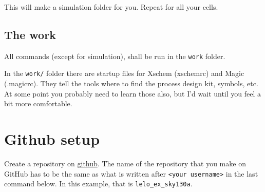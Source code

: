 \begin{Shaded}
\begin{Highlighting}[]
\end{Highlighting}
\end{Shaded}

This will make a simulation folder for you. Repeat for all your cells.

\begin{Shaded}
\begin{Highlighting}[]
   \AttributeTok{{-}}\OperatorTok{\textgreater{}}
\end{Highlighting}
\end{Shaded}

\subsection{The work}\label{the-work}

All commands (except for simulation), shall be run in the \texttt{work}
folder.

In the \texttt{work/} folder there are startup files for Xschem
(xschemrc) and Magic (.magicrc). They tell the tools where to find the
process design kit, symbols, etc. At some point you probably need to
learn those also, but I'd wait until you feel a bit more comfortable.

\begin{Shaded}
\begin{Highlighting}[]
  \AttributeTok{{-}}\OperatorTok{\textgreater{}}
  \AttributeTok{{-}}\OperatorTok{\textgreater{}}
\end{Highlighting}
\end{Shaded}

\section{Github setup}\label{github-setup}

Create a repository on \href{https://github.com}{github}. The name of
the repository that you make on GitHub has to be the same as what is
written after \texttt{\textless{}your\ username\textgreater{}} in the
last command below. In this example, that is \texttt{lelo\_ex\_sky130a}.

